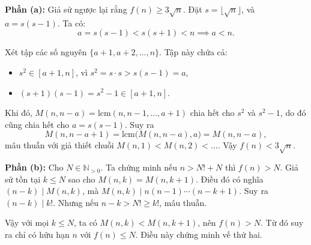\documentclass[../03-arithmetic-functions.tex]{subfiles}
\begin{document}
\begin{soln}
    \textbf{Phần (a):} Giả sử ngược lại rằng \( f(n) \ge 3\sqrt{n} \). Đặt \( s = \lfloor \sqrt{n} \rfloor \), và \( a = s(s - 1) \). Ta có:
    \[
        a = s(s - 1) < s(s + 1) < n \implies a < n.
    \]
    
    Xét tập các số nguyên \( \{a+1, a+2, \dots, n\} \). Tập này chứa cả:
    \begin{itemize}[topsep=0pt, partopsep=0pt, itemsep=0pt]
        \item \( s^2 \in [a+1, n] \), vì \( s^2 = s \cdot s > s(s-1) = a \),
        \item \( (s+1)(s-1) = s^2 - 1 \in [a+1, n] \).
    \end{itemize}
    
    Khi đó, \( M(n, n - a) = \mathrm{lcm}(n, n-1, \dots, a+1) \) chia hết cho \( s^2 \) và \( s^2 - 1 \), do đó cũng chia hết cho \( a = s(s-1) \).  
    Suy ra
    \[
        M(n, n - a + 1) = \mathrm{lcm}\!\bigl(M(n,n-a),a\bigr) = M(n,n-a),
    \]
    mâu thuẫn với giả thiết chuỗi \( M(n,1) < M(n,2) < \dots \). Vậy \( f(n) < 3\sqrt{n} \).

    \textbf{Phần (b):} Cho \( N \in \mathbb{N}_{>0} \). Ta chứng minh nếu \( n > N! + N \) thì \( f(n) > N \).  
    Giả sử tồn tại \( k \le N \) sao cho \( M(n,k) = M(n,k+1) \). Điều đó có nghĩa \( (n-k) \mid M(n,k) \), mà \( M(n,k) \mid n(n-1)\cdots(n-k+1) \). Suy ra \( (n-k) \mid k! \). Nhưng nếu \( n-k > N! \ge k! \), mâu thuẫn.  

    Vậy với mọi \( k \le N \), ta có \( M(n,k) < M(n,k+1) \), nên \( f(n) > N \).  
    Từ đó suy ra chỉ có hữu hạn \( n \) với \( f(n) \le N \). Điều này chứng minh vế thứ hai.
\end{soln}

\end{document}
